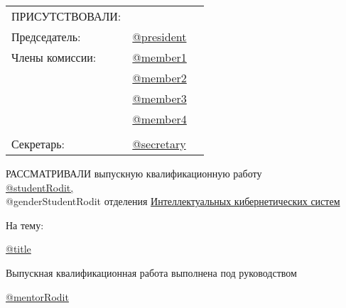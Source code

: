 \documentclass[a4paper,12pt]{article} %
\begin{document}
\begin{center} 		
	\begin{tabular}{lll}
		\vspace{0.2cm}
		ПРИСУТСТВОВАЛИ:\\
		\vspace{0.4cm}
		Председатель:  \hspace{2cm} 	& \underline{@president}  \\
		Члены комиссии:\hspace{2cm} 	& \underline{@member1}  \\
					   \hspace{2cm}  	& \underline{@member2}  \\
					   \hspace{2cm}		& \underline{@member3}  \\
					   \hspace{2cm}		& \underline{@member4}  \\ 
	   \vspace{-0.25cm}
		 	\\			
		Секретарь:     \hspace{2cm}		& \underline{@secretary}  \\	    
	\end{tabular}
\end{center}
	\vspace{0.2cm}
	
	\hspace{1cm}РАССМАТРИВАЛИ выпускную квалификационную работу \\
	
	\vspace{-0.5cm}
	\hspace{1cm}\underline{@studentRodit,}\\
	
	\vspace{-0.4cm}
	\hspace{1cm}@genderStudentRodit отделения \underline{Интеллектуальных кибернетических систем}

    \vspace{0.2cm}
	\hspace{1cm}На тему: 

	\hspace{1cm}\underline{@title}
	
    \vspace{0.2cm}
	\hspace{1cm}Выпускная квалификационная работа выполнена под руководством
	
	
    \hspace{1cm}\underline{@mentorRodit}\\
\end{document}
